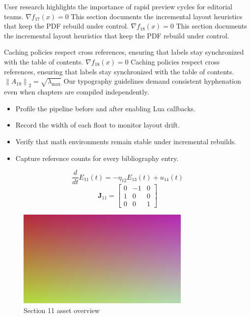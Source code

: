    User research highlights the importance of rapid preview cycles for editorial teams.  $\nabla f_{17}(x) = 0$  This section documents the incremental layout heuristics that keep the PDF rebuild under control.  $\nabla f_{18}(x) = 0$  This section documents the incremental layout heuristics that keep the PDF rebuild under control.
    \par
  
    Caching policies respect cross references, ensuring that labels stay synchronized with the table of contents.  $\nabla f_{18}(x) = 0$  Caching policies respect cross references, ensuring that labels stay synchronized with the table of contents.  $\left\|A_{19}\right\|_{2} = \sqrt{\lambda_{\max}}$  Our typography guidelines demand consistent hyphenation even when chapters are compiled independently.
    \par
  
    \begin{itemize}
      
    \item Profile the pipeline before and after enabling Lua callbacks.
    \item Record the width of each float to monitor layout drift.
    \item Verify that math environments remain stable under incremental rebuilds.
    \item Capture reference counts for every bibliography entry.
    \end{itemize}
\begin{equation}
\label{eq:sec11-eq1}
\frac{d}{dt} E_{11}(t) = -\eta_{12} E_{13}(t) + u_{14}(t)
\end{equation}
\[
\mathbf{J}_{11} = \begin{bmatrix} 0 & -1 & 0 \\ 1 & 0 & 0 \\ 0 & 0 & 1 \end{bmatrix}
\]

    \begin{figure}[htbp]
      \centering
      
          \includegraphics[width=0.82\linewidth]{../assets/images/placeholder2.png}
        
        \caption{Section 11 asset overview}
      
        \label{fig:fig-sec11}
      
    \end{figure}
  
